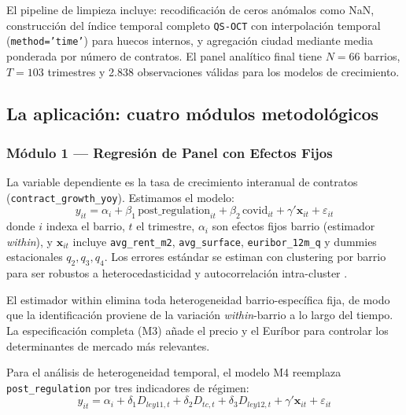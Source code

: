 \documentclass[12pt,a4paper]{article}
\begin{document}
El pipeline de limpieza incluye: recodificación de ceros anómalos como NaN, construcción
del índice temporal completo \texttt{QS-OCT} con interpolación temporal (\texttt{method='time'})
para huecos internos, y agregación ciudad mediante media ponderada por número de contratos.
El panel analítico final tiene $N=66$ barrios, $T=103$ trimestres y 2.838 observaciones
válidas para los modelos de crecimiento.

\subsection{La aplicación: cuatro módulos metodológicos}

\subsubsection{Módulo 1 --- Regresión de Panel con Efectos Fijos}

La variable dependiente es la tasa de crecimiento interanual de contratos
(\texttt{contract\_growth\_yoy}). Estimamos el modelo:
\begin{equation}
  y_{it} = \alpha_i + \beta_1 \,\text{post\_regulation}_{it}
         + \beta_2 \,\text{covid}_{it}
         + \gamma'\mathbf{x}_{it} + \varepsilon_{it}
  \label{eq:panel}
\end{equation}
donde $i$ indexa el barrio, $t$ el trimestre, $\alpha_i$ son efectos fijos barrio
(estimador \textit{within}), y $\mathbf{x}_{it}$ incluye \texttt{avg\_rent\_m2},
\texttt{avg\_surface}, \texttt{euribor\_12m\_q} y dummies estacionales $q_2, q_3, q_4$.
Los errores estándar se estiman con clustering por barrio para ser robustos a
heterocedasticidad y autocorrelación intra-cluster \citep{baltagi2021econometric}.

El estimador within elimina toda heterogeneidad barrio-específica fija, de modo que
la identificación proviene de la variación \textit{within}-barrio a lo largo del tiempo.
La especificación completa (M3) añade el precio y el Euríbor para controlar los
determinantes de mercado más relevantes.

Para el análisis de heterogeneidad temporal, el modelo M4 reemplaza
\texttt{post\_regulation} por tres indicadores de régimen:
\begin{equation}
  y_{it} = \alpha_i + \delta_1 D_{ley11,t} + \delta_2 D_{tc,t} + \delta_3 D_{ley12,t}
         + \gamma'\mathbf{x}_{it} + \varepsilon_{it}
  \label{eq:panel_m4}
\end{equation}
\end{document}
